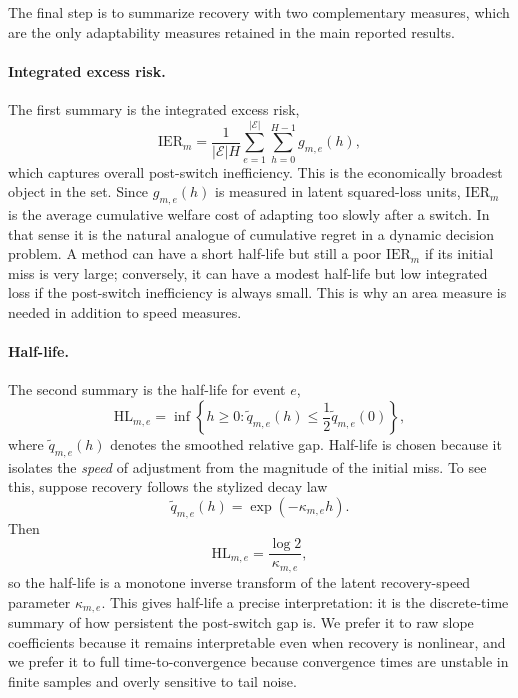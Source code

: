 \documentclass[11pt,a4paper]{article}
\begin{document}
The final step is to summarize recovery with two complementary measures, which are the only adaptability measures retained in the main reported results.

\paragraph{Integrated excess risk.}
The first summary is the integrated excess risk,
\begin{equation}
\mathrm{IER}_m = \frac{1}{|\mathcal{E}|H}\sum_{e=1}^{|\mathcal{E}|}\sum_{h=0}^{H-1} g_{m,e}(h),
\end{equation}
which captures overall post-switch inefficiency. This is the economically broadest object in the set. Since $g_{m,e}(h)$ is measured in latent squared-loss units, $\mathrm{IER}_m$ is the average cumulative welfare cost of adapting too slowly after a switch. In that sense it is the natural analogue of cumulative regret in a dynamic decision problem. A method can have a short half-life but still a poor $\mathrm{IER}_m$ if its initial miss is very large; conversely, it can have a modest half-life but low integrated loss if the post-switch inefficiency is always small. This is why an area measure is needed in addition to speed measures.

\paragraph{Half-life.}
The second summary is the half-life for event $e$,
\begin{equation}
\mathrm{HL}_{m,e} = \inf\left\{ h \geq 0 : \widetilde{q}_{m,e}(h) \leq \frac{1}{2}\widetilde{q}_{m,e}(0) \right\},
\end{equation}
where $\widetilde{q}_{m,e}(h)$ denotes the smoothed relative gap. Half-life is chosen because it isolates the \emph{speed} of adjustment from the magnitude of the initial miss. To see this, suppose recovery follows the stylized decay law
\begin{equation}
\widetilde{q}_{m,e}(h) = \exp(-\kappa_{m,e} h).
\end{equation}
Then
\begin{equation}
\mathrm{HL}_{m,e} = \frac{\log 2}{\kappa_{m,e}},
\end{equation}
so the half-life is a monotone inverse transform of the latent recovery-speed parameter $\kappa_{m,e}$. This gives half-life a precise interpretation: it is the discrete-time summary of how persistent the post-switch gap is. We prefer it to raw slope coefficients because it remains interpretable even when recovery is nonlinear, and we prefer it to full time-to-convergence because convergence times are unstable in finite samples and overly sensitive to tail noise.
\end{document}
